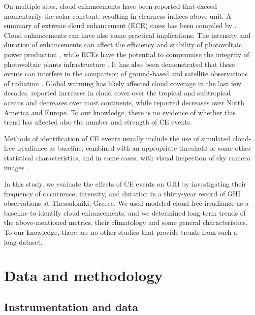 \documentclass[preprint, 5p,
authoryear]{elsarticle} %
\begin{document}
On multiple sites, cloud enhancements have been reported that exceed
momentarily the solar constant, resulting in clearness indices above
unit. A summary of extreme cloud enhancement (ECE) cases has been
compiled by \citet{Martins2022}. Cloud enhancements can have also some
practical implications. The intensity and duration of enhancements can
affect the efficiency and stability of photovoltaic power production
\citep{Lappalainen2020, Jaervelae2020}, while ECEs have the potential to
compromise the integrity of photovoltaic plants infrastructure
\citep{DoNascimento2019}. It has also been demonstrated that these
events can interfere in the comparison of ground-based and satellite
observations of radiation \citep{Damiani2018}. Global warming has likely
affected cloud coverage in the last few decades. \citet{Liu2023}
reported increases in cloud cover over the tropical and subtropical
oceans and decreases over most continents, while \citet{Dong2023}
reported decreases over North America and Europe. To our knowledge,
there is no evidence of whether this trend has affected also the number
and strength of CE events.

Methods of identification of CE events usually include the use of
simulated cloud-free irradiance as baseline, combined with an
appropriate threshold or some other statistical characteristics, and in
some cases, with visual inspection of sky camera images \citep[ and
references therein]{Vamvakas2020, Mol2023}.

In this study, we evaluate the effects of CE events on GHI by
investigating their frequency of occurrence, intensity, and duration in
a thirty-year record of GHI observations at Thessaloniki, Greece. We
used modeled cloud-free irradiance as a baseline to identify cloud
enhancements, and we determined long-term trends of the above-mentioned
metrics, their climatology and some general characteristics. To our
knowledge, there are no other studies that provide trends from such a
long dataset.

\hypertarget{data-and-methodology}{%
\section{Data and methodology}\label{data-and-methodology}}

\hypertarget{instrumentation-and-data}{%
\subsection{Instrumentation and data}\label{instrumentation-and-data}}
\end{document}
